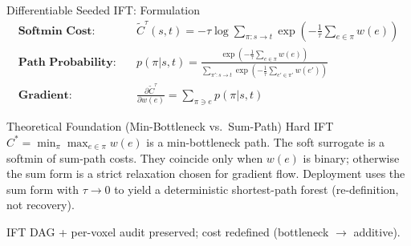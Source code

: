 \documentclass[aspectratio=169,11pt,xcolor=table]{beamer}
\begin{document}
\begin{frame}{Differentiable Seeded IFT: Formulation}
\footnotesize
\begin{align*}
\textbf{Softmin Cost:} \quad & \tilde{C}^\tau(s,t) = -\tau \log \sum_{\pi:s\to t} \exp\left(-\frac{1}{\tau}\sum_{e\in\pi} w(e)\right) \\[0.25em]
\textbf{Path Probability:} \quad & p(\pi|s,t) = \frac{\exp\left(-\frac{1}{\tau}\sum_{e\in\pi} w(e)\right)}{\sum_{\pi':s\to t} \exp\left(-\frac{1}{\tau}\sum_{e'\in\pi'} w(e')\right)} \\[0.25em]
\textbf{Gradient:} \quad & \frac{\partial \tilde{C}^\tau}{\partial w(e)} = \sum_{\pi\ni e} p(\pi|s,t)
\end{align*}
\vspace{-0.1cm}
\begin{alertblock}{Theoretical Foundation (Min-Bottleneck vs.\ Sum-Path)}
\scriptsize
Hard IFT $C^* = \min_\pi \max_{e\in\pi} w(e)$ is a min-bottleneck path. The soft surrogate is a softmin of sum-path costs. They coincide only when $w(e)$ is binary; otherwise the sum form is a strict relaxation chosen for gradient flow. Deployment uses the sum form with $\tau\to0$ to yield a deterministic shortest-path forest (re-definition, not recovery).
\end{alertblock}
{\scriptsize\color{gray} IFT DAG + per-voxel audit preserved; cost redefined (bottleneck $\to$ additive).}
\end{frame}
\end{document}
